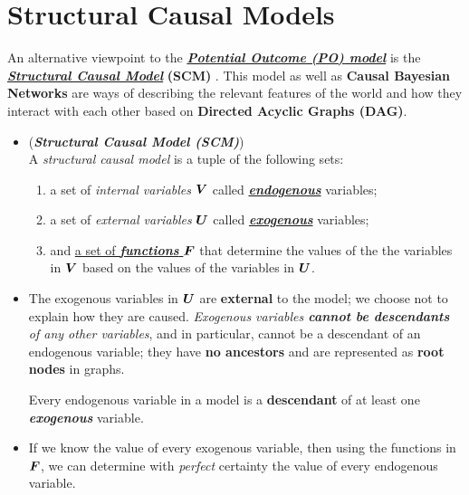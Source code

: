 \documentclass[11pt]{article}
\begin{document}
\section{Structural Causal Models}
An alternative viewpoint to the \underline{\emph{\textbf{Potential Outcome (PO) model}}} \citep{imbens2015causal, rosenbaum2017observation} is the \underline{\emph{\textbf{Structural Causal Model}}} \textbf{(SCM)} \citep{pearl2000causal, pearl2009causal, glymour2016causal}. This model as well as \textbf{Causal Bayesian Networks} \citep{pearl2000causal, pearl2009causal} are ways of describing the relevant features of the world and how they interact with each other based on  \textbf{Directed Acyclic Graphs (DAG)}.
\begin{itemize}
\item \begin{definition} (\emph{\textbf{Structural Causal Model (SCM)}})\\
 A \emph{structural causal model} is a tuple of the following sets:
 \begin{enumerate}
 \item a set of \emph{internal variables} $\boldsymbol{V}$ called \underline{\textbf{\emph{endogenous}}} variables;
 \item a set of \emph{external variables} $\boldsymbol{U}$ called  \underline{\textbf{\emph{exogenous}}} variables;
 \item and \underline{a set of \emph{\textbf{functions}} $\boldsymbol{F}$} that determine the values of the the variables in $\boldsymbol{V}$ based on the values of the variables in $\boldsymbol{U}$.
\end{enumerate} 
\end{definition}

\item The exogenous variables in $\boldsymbol{U}$ are \textbf{external} to the model; we choose not to explain how they are caused.  \emph{Exogenous variables \textbf{cannot be descendants} of any other variables}, and in particular, cannot be a descendant of an endogenous variable; they have \textbf{no ancestors} and are represented as \textbf{root nodes} in graphs.

Every endogenous variable in a model is a \textbf{descendant} of at least one \emph{\textbf{exogenous}} variable. 

\item If we know the value of every exogenous variable, then using the functions in $\boldsymbol{F}$, we can determine with \emph{perfect} certainty the value of every endogenous variable.


\end{itemize}
\end{document}
